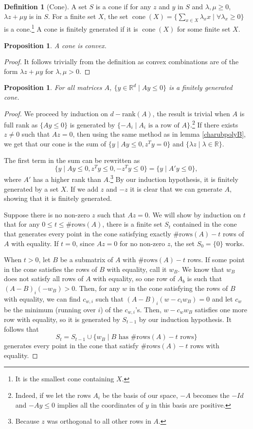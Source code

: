 \documentclass{tufte-handout}
\newtheorem{prop}[thm]{Proposition}
\theoremstyle{definition}
\newtheorem{defn}[thm]{Definition}
\theoremstyle{remark}
\newcommand{\R}{\mathbb{R}}
\DeclareMathOperator{\cone}{cone}
\begin{document}
\begin{defn}[Cone]
	A set $S$ is a cone if for any $z$ and $y$ in $S$ and $\lambda, \mu\geq 0$, $\lambda z + \mu y$ is in $S$. For a finite set $X$, the set $\cone(X) = \{\sum_{x \in X} \lambda_x x\mid \forall \lambda_x \geq 0\}$ is a cone.\footnote{It is the smallest cone containing $X$.} A cone is finitely generated if it is $\cone(X)$ for some finite set $X$.
\end{defn}
\begin{prop}
	A cone is convex.
\end{prop}
\begin{proof}
	It follows trivially from the definition as convex combinations are of the form $\lambda z + \mu y $ for $\lambda , \mu > 0$.
\end{proof}
\begin{prop}
	For all matrices $A$, $\{y\in \R^d \mid Ay\leq 0\}$ is a finitely generated cone.
\end{prop}
\begin{proof}
	We proceed by induction on $d-\text{rank}(A)$, the result is trivial when $A$ is full rank as $\{Ay \leq 0\}$ is generated by $\{-A_i\mid A_i \text{ is a row of } A\}$.\footnote{Indeed, if we let the rows $A_i$ be the basis of our space, $-A$ becomes the $-Id$ and $-Ay\leq 0$ implies all the coordinates of $y$ in this basis are positive.} If there exists $z\neq 0$ such that $Az = 0$, then using the same method as in lemma \ref{charubpolyB}, we get that our cone is the sum of $\{y\mid Ay \leq 0, z^Ty = 0\}$ and $\{\lambda z \mid \lambda \in \R\}$.
	
	The first term in the sum can be rewritten as 
	$$\{y \mid Ay \leq 0, z^Ty \leq 0, -z^Ty \leq 0\} = \{y\mid A'y\leq 0\},$$
	where $A'$ has a higher rank than $A$.\footnote{Because $z$ was orthogonal to all other rows in $A$.} By our induction hypothesis, it is finitely generated by a set $X$. If we add $z$ and $-z$ it is clear that we can generate $A$, showing that it is finitely generated.
	
	Suppose there is no non-zero $z$ such that $Az = 0$. We will show by induction on $t$ that for any $0 \leq t \leq \text{\#rows}(A)$, there is a finite set $S_t$ contained in the cone that generates every point in the cone satisfying exactly $\text{\#rows}(A) -t$ rows of $A$ with equality. If $t=0$, since $Az = 0$ for no non-zero $z$, the set $S_0 = \{0\}$ works.
	
	When $t> 0$, let $B$ be a submatrix of $A$ with $\text{\#rows}(A) -t$ rows. If some point in the cone satisfies the rows of $B$ with equality, call it $w_B$. We know that $w_B$ does not satisfy all rows of $A$ with equality, so one row of $A_b$ is such that $(A-B)_i(-w_B) > 0$. Then, for any $w$ in the cone satisfying the rows of $B$ with equality, we can find $c_{w,i}$ such that $(A-B)_i(w-c_iw_B)=0$ and let $c_w$ be the minimum (running over $i$) of the $c_{w,i}$'s. Then, $w-c_{w}w_B$ satisfies one more row with equality, so it is generated by $S_{t-1}$ by our induction hypothesis. It follows that $$S_t = S_{t-1} \cup \{w_B \mid B \text{ has \#rows}(A) - t \text{ rows}\}$$ generates every point in the cone that satisfy $\text{\#rows}(A) -t$ rows with equality.
\end{proof}
\end{document}
